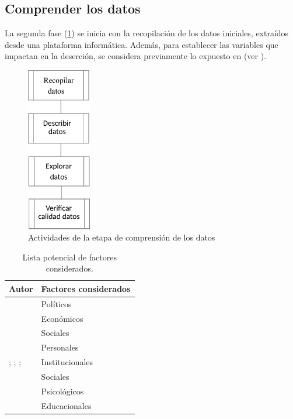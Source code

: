 \documentclass[portuguese]{textolivre}
\begin{document}
\subsection{Comprender los datos}\label{sec-fmt-manuscrito}

La segunda fase (\cref{Figura 2}) se inicia con la recopilación de los datos iniciales, extraídos desde una plataforma informática. Además, para establecer las variables que impactan en la deserción, se considera previamente lo expuesto en \cite{Cabrera2006} (ver ).

\begin{figure}[htbp]
 \centering
 \includegraphics[width=0.25\textwidth]{images/fig-002.pdf}
 \caption{Actividades de la etapa de comprensión de los datos}
 \label{Figura 2}
\end{figure}

\begin{table}[htpb]
  \caption{Lista potencial de factores considerados.}
  \label{Tabla 2}
  \centering
  \begin{tabular}{ll}
  \toprule
  Autor & Factores considerados\\
  \midrule
  \multirow{3}{5cm}{\cite{Lujan1981}}  &
  Políticos\\
  & Económicos\\
  & Sociales\\
  \cmidrule{1-2}
  \multirow{3}{5cm}{\cite{Ryan2003}; \cite{Wasserman2001}; \cite{Kirton2000}; \textcite{Yip2019}}  &
  Personales\\
  & Institucionales\\
  & Sociales\\
  & Psicológicos\\
  & Educacionales\\
  \bottomrule
  \end{tabular}
\end{table}
\end{document}
